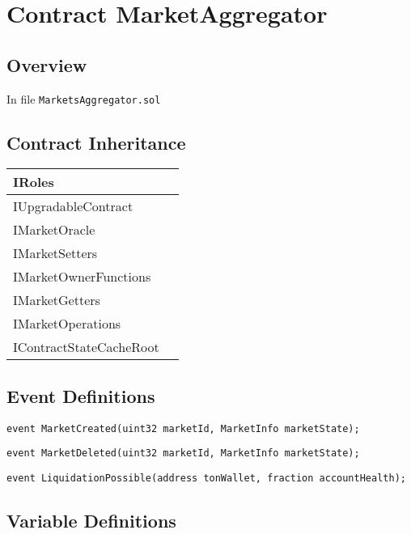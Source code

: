 
\chapter{Contract MarketAggregator}

\minitoc

\section{Overview}


In file {\tt MarketsAggregator.sol}

\section{Contract Inheritance}


\noindent\begin{tabular}{|l|p{5cm}|}\hline
IRoles & \\\hline
IUpgradableContract & \\\hline
IMarketOracle & \\\hline
IMarketSetters & \\\hline
IMarketOwnerFunctions & \\\hline
IMarketGetters & \\\hline
IMarketOperations & \\\hline
IContractStateCacheRoot & \\\hline
\end{tabular}


\section{Event Definitions}


\begin{lstlisting}[firstnumber=32]
    event MarketCreated(uint32 marketId, MarketInfo marketState);
\end{lstlisting}

\begin{lstlisting}[firstnumber=33]
    event MarketDeleted(uint32 marketId, MarketInfo marketState);
\end{lstlisting}

\begin{lstlisting}[firstnumber=34]
    event LiquidationPossible(address tonWallet, fraction accountHealth);
\end{lstlisting}

\section{Variable Definitions}


